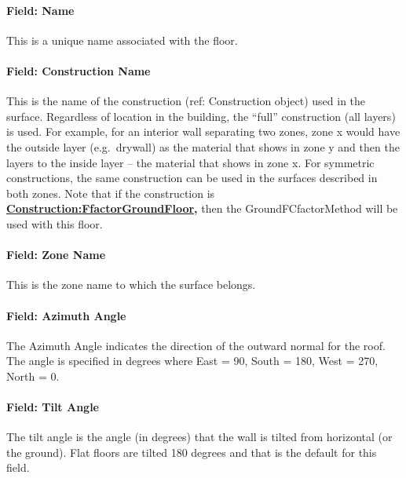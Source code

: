 \paragraph{Field: Name}\label{field-name-7-022}

This is a unique name associated with the floor.

\paragraph{Field: Construction Name}\label{field-construction-name-7}

This is the name of the construction (ref: Construction object) used in the surface. Regardless of location in the building, the ``full'' construction (all layers) is used. For example, for an interior wall separating two zones, zone x would have the outside layer (e.g.~drywall) as the material that shows in zone y and then the layers to the inside layer -- the material that shows in zone x. For symmetric constructions, the same construction can be used in the surfaces described in both zones. Note that if the construction is \textbf{\hyperref[constructionffactorgroundfloor]{Construction:FfactorGroundFloor},} then the GroundFCfactorMethod will be used with this floor.

\paragraph{Field: Zone Name}\label{field-zone-name-7-004}

This is the zone name to which the surface belongs.

\paragraph{Field: Azimuth Angle}\label{field-azimuth-angle-7}

The Azimuth Angle indicates the direction of the outward normal for the roof. The angle is specified in degrees where East = 90, South = 180, West = 270, North = 0.

\paragraph{Field: Tilt Angle}\label{field-tilt-angle-7}

The tilt angle is the angle (in degrees) that the wall is tilted from horizontal (or the ground). Flat floors are tilted 180 degrees and that is the default for this field.

